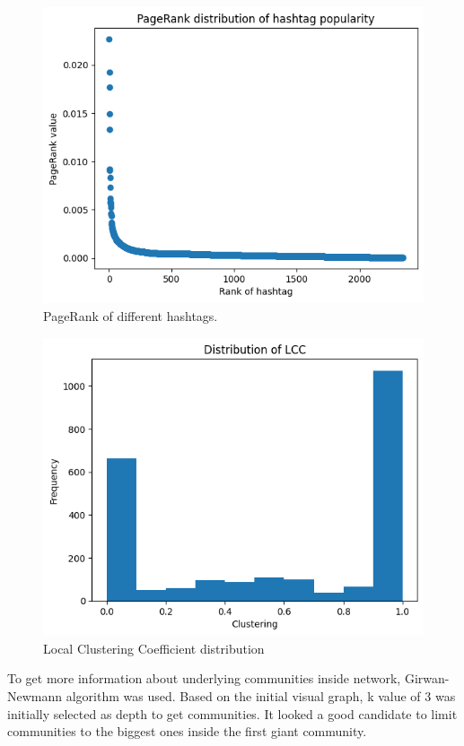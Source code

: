 \documentclass[conference]{IEEEtran}
\begin{document}
\begin{figure}
    \includegraphics[scale=0.6]{figures/pagerank_distribution}
    \caption{PageRank of different hashtags.}
    \label{fig:pagerank}
\end{figure}

\begin{figure}
    \includegraphics[scale=0.6]{figures/lcc_distribution}
    \caption{Local Clustering Coefficient distribution}
    \label{fig:lcc}
\end{figure}

To get more information about underlying communities inside network, Girwan-Newmann algorithm was used.
Based on the initial visual graph, k value of 3 was initially selected as depth to get communities.
It looked a good candidate to limit communities to the biggest ones inside the first giant community.
\end{document}
